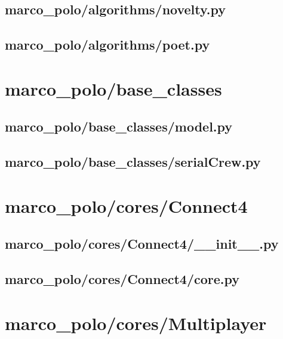 \documentclass{article}
\begin{document}
\subsection[novelty.py]{marco\_polo/algorithms/novelty.py}

\newpage

\subsection[poet.py]{marco\_polo/algorithms/poet.py}

\newpage

\section{marco\_polo/base\_classes}
\subsection[model.py]{marco\_polo/base\_classes/model.py}

\newpage

\subsection[serialCrew.py]{marco\_polo/base\_classes/serialCrew.py}

\newpage

\section{marco\_polo/cores/Connect4}
\subsection[\_\_init\_\_.py]{marco\_polo/cores/Connect4/\_\_init\_\_.py}

\newpage

\subsection[core.py]{marco\_polo/cores/Connect4/core.py}

\newpage

\section{marco\_polo/cores/Multiplayer}
\end{document}
